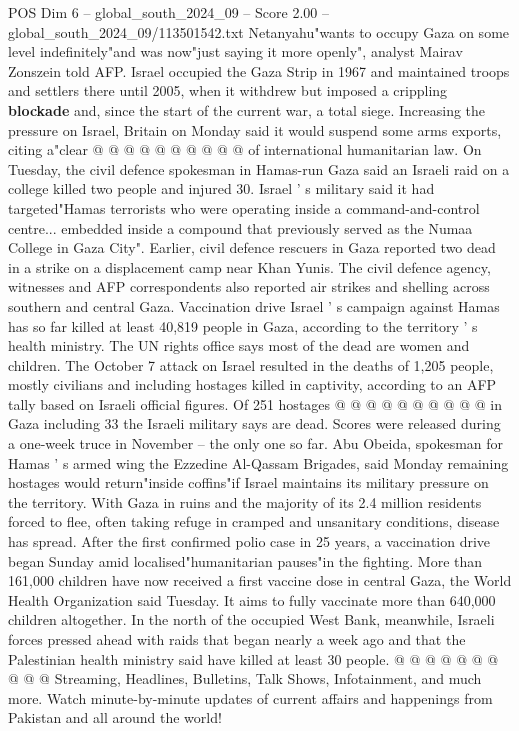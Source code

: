 \begin{textsample}{POS Dim 6 – global\_south\_2024\_09 – Score 2.00 – global\_south\_2024\_09/113501542.txt}
Netanyahu"wants to occupy Gaza on some level indefinitely"and was now"just saying it more openly", analyst Mairav Zonszein told AFP.
Israel occupied the Gaza Strip in 1967 and maintained troops and settlers there until 2005, when it withdrew but imposed a crippling \textbf{blockade} and, since the start of the current war, a total siege.
Increasing the pressure on Israel, Britain on Monday said it would suspend some arms exports, citing a"clear @ @ @ @ @ @ @ @ @ @ of international humanitarian law.
On Tuesday, the civil defence spokesman in Hamas-run Gaza said an Israeli raid on a college killed two people and injured 30.
Israel ' s military said it had targeted"Hamas terrorists who were operating inside a command-and-control centre... embedded inside a compound that previously served as the Numaa College in Gaza City".
Earlier, civil defence rescuers in Gaza reported two dead in a strike on a displacement camp near Khan Yunis.
The civil defence agency, witnesses and AFP correspondents also reported air strikes and shelling across southern and central Gaza.
Vaccination drive Israel ' s campaign against Hamas has so far killed at least 40,819 people in Gaza, according to the territory ' s health ministry.
The UN rights office says most of the dead are women and children.
The October 7 attack on Israel resulted in the deaths of 1,205 people, mostly civilians and including hostages killed in captivity, according to an AFP tally based on Israeli official figures.
Of 251 hostages @ @ @ @ @ @ @ @ @ @ in Gaza including 33 the Israeli military says are dead.
Scores were released during a one-week truce in November -- the only one so far.
Abu Obeida, spokesman for Hamas ' s armed wing the Ezzedine Al-Qassam Brigades, said Monday remaining hostages would return"inside coffins"if Israel maintains its military pressure on the territory.
With Gaza in ruins and the majority of its 2.4 million residents forced to flee, often taking refuge in cramped and unsanitary conditions, disease has spread.
After the first confirmed polio case in 25 years, a vaccination drive began Sunday amid localised"humanitarian pauses"in the fighting.
More than 161,000 children have now received a first vaccine dose in central Gaza, the World Health Organization said Tuesday.
It aims to fully vaccinate more than 640,000 children altogether.
In the north of the occupied West Bank, meanwhile, Israeli forces pressed ahead with raids that began nearly a week ago and that the Palestinian health ministry said have killed at least 30 people. @ @ @ @ @ @ @ @ @ @ Streaming, Headlines, Bulletins, Talk Shows, Infotainment, and much more.
Watch minute-by-minute updates of current affairs and happenings from Pakistan and all around the world!

\end{textsample}
